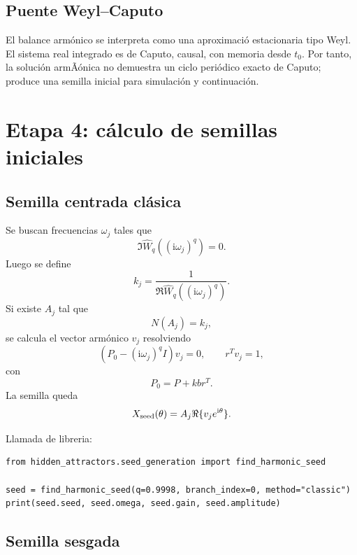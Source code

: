\documentclass[11pt]{article}
\newcommand{\ii}{\mathrm{i}}
\begin{document}
\subsection{Puente Weyl--Caputo}

El balance armónico se interpreta como una aproximació estacionaria tipo Weyl. El sistema real integrado es de Caputo, causal, con memoria desde \(t_0\). Por tanto, la solución armÃónica no demuestra un ciclo periódico exacto de Caputo; produce una semilla inicial para simulación y continuación.

\section{Etapa 4: cálculo de semillas iniciales}

\subsection{Semilla centrada clásica}

Se buscan frecuencias \(\omega_j\) tales que
\begin{equation}
\Im\widehat W_q((\ii\omega_j)^q)=0.
\end{equation}
Luego se define
\begin{equation}
 k_j=\frac{1}{\Re\widehat W_q((\ii\omega_j)^q)}.
\end{equation}
Si existe \(A_j\) tal que
\begin{equation}
 N(A_j)=k_j,
\end{equation}
se calcula el vector armónico \(v_j\) resolviendo
\begin{equation}
(P_0-(\ii\omega_j)^qI)v_j=0,
\qquad
r^Tv_j=1,
\end{equation}
con
\begin{equation}
P_0=P+kb r^T.
\end{equation}
La semilla queda
\begin{equation}
X_{\rm seed}(\theta)=A_j\Re\{v_je^{\ii\theta}\}.
\end{equation}

Llamada de libreria:
\begin{lstlisting}
from hidden_attractors.seed_generation import find_harmonic_seed

seed = find_harmonic_seed(q=0.9998, branch_index=0, method="classic")
print(seed.seed, seed.omega, seed.gain, seed.amplitude)
\end{lstlisting}

\subsection{Semilla sesgada}
\end{document}
